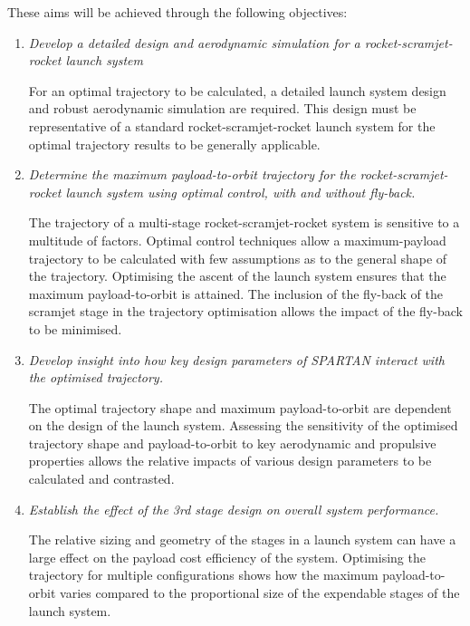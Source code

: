     
\vspace*{10pt}
    \noindent These aims will be achieved through the following objectives:
    \begin{enumerate}
    	 \item \emph{Develop a detailed design and aerodynamic simulation for a rocket-scramjet-rocket launch system}
    	 
    	   For an optimal trajectory to be calculated, a detailed launch system design and robust aerodynamic simulation are required. This design must be representative of a standard rocket-scramjet-rocket launch system for the optimal trajectory results to be generally applicable.\\

\item \emph{Determine the maximum payload-to-orbit trajectory for the rocket-scramjet-rocket launch system using optimal control, with and without fly-back.}

The trajectory of a multi-stage rocket-scramjet-rocket system is sensitive to a multitude of factors. Optimal control techniques allow a maximum-payload trajectory to be calculated with few assumptions as to the general shape of the trajectory. Optimising the ascent of the launch system ensures that the maximum payload-to-orbit is attained. The inclusion of the fly-back of the scramjet stage in the trajectory optimisation allows the impact of the fly-back to be minimised.\\

      \item \emph{Develop insight into how key design parameters of SPARTAN interact with the optimised trajectory.} 

	The optimal trajectory shape and maximum payload-to-orbit are dependent on the design of the launch system. 
	Assessing the sensitivity of the optimised trajectory shape and payload-to-orbit to key aerodynamic and propulsive properties allows the relative impacts of various design parameters to be calculated and contrasted. \\

      \item \emph{Establish the effect of the 3rd stage design on overall system performance.}

The relative sizing and geometry of the stages in a launch system can have a large effect on the payload cost efficiency of the system. Optimising the trajectory for multiple configurations shows how the maximum payload-to-orbit varies compared to the proportional size of the expendable stages of the launch system. \\


    \end{enumerate}

